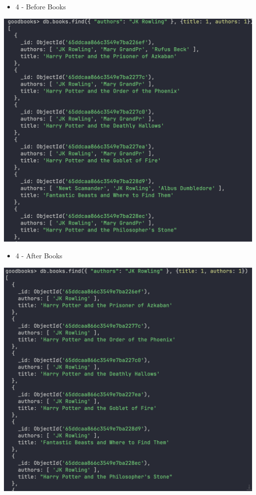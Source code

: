 \documentclass[11pt]{article}
\begin{document}
\begin{itemize}
\item 4 - Before Books
\end{itemize}
\begin{center}
\includegraphics[width=1\textwidth]{images/KFWJOR001/4-before-books.png}
\end{center}

\begin{itemize}
\item 4 - After Books
\end{itemize}
\begin{center}
\includegraphics[width=1\textwidth]{images/KFWJOR001/4-after-books.png}
\end{center}
\end{document}
